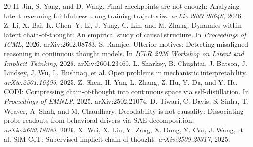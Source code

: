 \documentclass{article}
\begin{document}
\begin{thebibliography}{20}
 H. Jin, S. Yang, and D. Wang. Final checkpoints are not enough: Analyzing latent reasoning faithfulness along training trajectories. \emph{arXiv:2607.06648}, 2026.
 Z. Li, X. Bai, K. Chen, Y. Li, J. Yang, C. Lin, and M. Zhang. Dynamics within latent chain-of-thought: An empirical study of causal structure. In \emph{Proceedings of ICML}, 2026. arXiv:2602.08783.
 S. Ramjee. Ulterior motives: Detecting misaligned reasoning in continuous thought models. In \emph{ICLR 2026 Workshop on Latent and Implicit Thinking}, 2026. arXiv:2604.23460.
 L. Sharkey, B. Chughtai, J. Batson, J. Lindsey, J. Wu, L. Bushnaq, et al. Open problems in mechanistic interpretability. \emph{arXiv:2501.16496}, 2025.
 Z. Shen, H. Yan, L. Zhang, Z. Hu, Y. Du, and Y. He. CODI: Compressing chain-of-thought into continuous space via self-distillation. In \emph{Proceedings of EMNLP}, 2025. arXiv:2502.21074.
 D. Tiwari, C. Davis, S. Sinha, T. Weaver, A. Shah, and M. Chaudhary. Decodability is not causality: Dissociating probe readouts from behavioral drivers via SAE decomposition. \emph{arXiv:2609.18080}, 2026.
 X. Wei, X. Liu, Y. Zang, X. Dong, Y. Cao, J. Wang, et al. SIM-CoT: Supervised implicit chain-of-thought. \emph{arXiv:2509.20317}, 2025.
\end{thebibliography}


\end{document}
